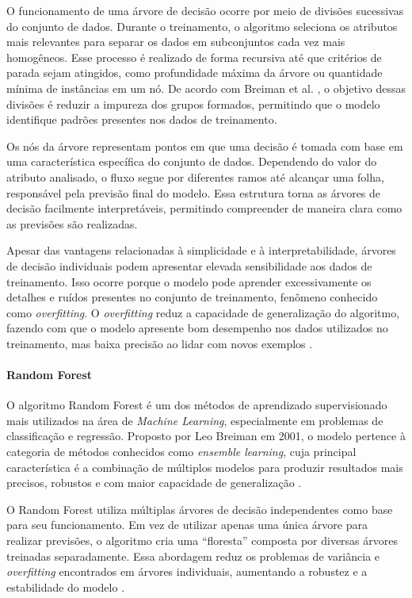\documentclass[
    12pt,                %
    openright,           %
    oneside,             %
    a4paper,             %
    english,             %
    brazil               %
]{abntex2}
\begin{document}
O funcionamento de uma árvore de decisão ocorre por meio de divisões sucessivas do conjunto de dados. Durante o treinamento, o algoritmo seleciona os atributos mais relevantes para separar os dados em subconjuntos cada vez mais homogêneos. Esse processo é realizado de forma recursiva até que critérios de parada sejam atingidos, como profundidade máxima da árvore ou quantidade mínima de instâncias em um nó. De acordo com Breiman et al. \cite{breiman1984}, o objetivo dessas divisões é reduzir a impureza dos grupos formados, permitindo que o modelo identifique padrões presentes nos dados de treinamento.

Os nós da árvore representam pontos em que uma decisão é tomada com base em uma característica específica do conjunto de dados. Dependendo do valor do atributo analisado, o fluxo segue por diferentes ramos até alcançar uma folha, responsável pela previsão final do modelo. Essa estrutura torna as árvores de decisão facilmente interpretáveis, permitindo compreender de maneira clara como as previsões são realizadas.

Apesar das vantagens relacionadas à simplicidade e à interpretabilidade, árvores de decisão individuais podem apresentar elevada sensibilidade aos dados de treinamento. Isso ocorre porque o modelo pode aprender excessivamente os detalhes e ruídos presentes no conjunto de treinamento, fenômeno conhecido como \textit{overfitting}. O \textit{overfitting} reduz a capacidade de generalização do algoritmo, fazendo com que o modelo apresente bom desempenho nos dados utilizados no treinamento, mas baixa precisão ao lidar com novos exemplos \cite{breiman1984}.

\paragraph{Random Forest}

O algoritmo Random Forest é um dos métodos de aprendizado supervisionado mais utilizados na área de \textit{Machine Learning}, especialmente em problemas de classificação e regressão. Proposto por Leo Breiman em 2001, o modelo pertence à categoria de métodos conhecidos como \textit{ensemble learning}, cuja principal característica é a combinação de múltiplos modelos para produzir resultados mais precisos, robustos e com maior capacidade de generalização \cite{breiman2001}.

O Random Forest utiliza múltiplas árvores de decisão independentes como base para seu funcionamento. Em vez de utilizar apenas uma única árvore para realizar previsões, o algoritmo cria uma ``floresta'' composta por diversas árvores treinadas separadamente. Essa abordagem reduz os problemas de variância e \textit{overfitting} encontrados em árvores individuais, aumentando a robustez e a estabilidade do modelo \cite{breiman2001}.
\end{document}
